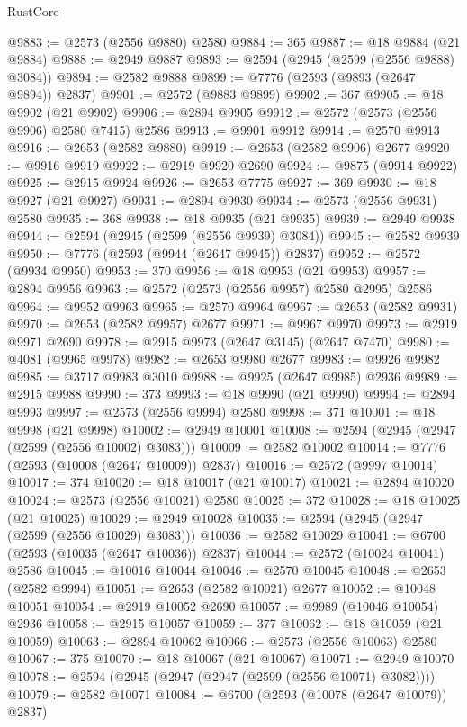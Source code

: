 \begin{lexlean}{RustCore}
\begin{coremodule}
@9883 := @2573 (@2556 @9880) @2580
@9884 := 365
@9887 := @18 @9884 (@21 @9884)
@9888 := @2949 @9887
@9893 := @2594 (@2945 (@2599 (@2556 @9888) @3084))
@9894 := @2582 @9888
@9899 := @7776 (@2593 (@9893 (@2647 @9894)) @2837)
@9901 := @2572 (@9883 @9899)
@9902 := 367
@9905 := @18 @9902 (@21 @9902)
@9906 := @2894 @9905
@9912 := @2572 (@2573 (@2556 @9906) @2580 @7415) @2586
@9913 := @9901 @9912
@9914 := @2570 @9913
@9916 := @2653 (@2582 @9880)
@9919 := @2653 (@2582 @9906) @2677
@9920 := @9916 @9919
@9922 := @2919 @9920 @2690
@9924 := @9875 (@9914 @9922)
@9925 := @2915 @9924
@9926 := @2653 @7775
@9927 := 369
@9930 := @18 @9927 (@21 @9927)
@9931 := @2894 @9930
@9934 := @2573 (@2556 @9931) @2580
@9935 := 368
@9938 := @18 @9935 (@21 @9935)
@9939 := @2949 @9938
@9944 := @2594 (@2945 (@2599 (@2556 @9939) @3084))
@9945 := @2582 @9939
@9950 := @7776 (@2593 (@9944 (@2647 @9945)) @2837)
@9952 := @2572 (@9934 @9950)
@9953 := 370
@9956 := @18 @9953 (@21 @9953)
@9957 := @2894 @9956
@9963 := @2572 (@2573 (@2556 @9957) @2580 @2995) @2586
@9964 := @9952 @9963
@9965 := @2570 @9964
@9967 := @2653 (@2582 @9931)
@9970 := @2653 (@2582 @9957) @2677
@9971 := @9967 @9970
@9973 := @2919 @9971 @2690
@9978 := @2915 @9973 (@2647 @3145) (@2647 @7470)
@9980 := @4081 (@9965 @9978)
@9982 := @2653 @9980 @2677
@9983 := @9926 @9982
@9985 := @3717 @9983 @3010
@9988 := @9925 (@2647 @9985) @2936
@9989 := @2915 @9988
@9990 := 373
@9993 := @18 @9990 (@21 @9990)
@9994 := @2894 @9993
@9997 := @2573 (@2556 @9994) @2580
@9998 := 371
@10001 := @18 @9998 (@21 @9998)
@10002 := @2949 @10001
@10008 := @2594 (@2945 (@2947 (@2599 (@2556 @10002) @3083)))
@10009 := @2582 @10002
@10014 := @7776 (@2593 (@10008 (@2647 @10009)) @2837)
@10016 := @2572 (@9997 @10014)
@10017 := 374
@10020 := @18 @10017 (@21 @10017)
@10021 := @2894 @10020
@10024 := @2573 (@2556 @10021) @2580
@10025 := 372
@10028 := @18 @10025 (@21 @10025)
@10029 := @2949 @10028
@10035 := @2594 (@2945 (@2947 (@2599 (@2556 @10029) @3083)))
@10036 := @2582 @10029
@10041 := @6700 (@2593 (@10035 (@2647 @10036)) @2837)
@10044 := @2572 (@10024 @10041) @2586
@10045 := @10016 @10044
@10046 := @2570 @10045
@10048 := @2653 (@2582 @9994)
@10051 := @2653 (@2582 @10021) @2677
@10052 := @10048 @10051
@10054 := @2919 @10052 @2690
@10057 := @9989 (@10046 @10054) @2936
@10058 := @2915 @10057
@10059 := 377
@10062 := @18 @10059 (@21 @10059)
@10063 := @2894 @10062
@10066 := @2573 (@2556 @10063) @2580
@10067 := 375
@10070 := @18 @10067 (@21 @10067)
@10071 := @2949 @10070
@10078 := @2594 (@2945 (@2947 (@2947 (@2599 (@2556 @10071) @3082))))
@10079 := @2582 @10071
@10084 := @6700 (@2593 (@10078 (@2647 @10079)) @2837)

\end{coremodule}
\end{lexlean}

